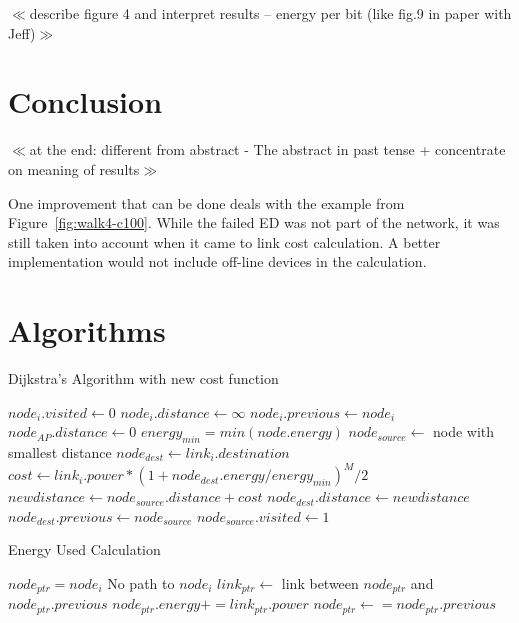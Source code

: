 \documentclass{article}
\begin{document}
$\ll$describe figure  4 and interpret results – energy per bit (like fig.9 in paper with Jeff)$\gg$ 

\section{Conclusion}
$\ll$at the end: different from abstract -  The abstract in past tense + concentrate on meaning of results$\gg$

One improvement that can be done deals with the example from Figure~\ref{fig:walk4-c100}. While the failed ED was not part of the network, it was still taken into account when it came to link cost calculation. A better implementation would not include off-line devices in the calculation.

{}


\appendix
\section{Algorithms}\label{appendix:algorithms}
\begin{algorithm}[!ht]
\caption{Dijkstra's Algorithm with new cost function}
\label{alg:dijkstra}
\begin{algorithmic}
	\STATE $node_i.visited \leftarrow 0$
	\STATE $node_i.distance \leftarrow \infty$
	\STATE $node_i.previous \leftarrow node_i$
\ENDFOR
\STATE $node_{AP}.distance \leftarrow 0$
\STATE $energy_{min} = min(node.energy)$
	\STATE $node_{source} \leftarrow $ node with smallest distance
			\STATE $node_{dest} \leftarrow link_i.destination$
				\STATE $cost \leftarrow link_i.power * (1 + node_{dest}.energy/energy_{min} )^M/2$
				\STATE $newdistance \leftarrow node_{source}.distance + cost$
				\STATE$node_{dest}.distance \leftarrow newdistance$
				\STATE$node_{dest}.previous \leftarrow node_{source}$
				\ENDIF
			\ENDIF
		\ENDIF
	\ENDFOR
	\STATE $node_{source}.visited \leftarrow 1$
\ENDWHILE
\end{algorithmic}
\end{algorithm}

\begin{algorithm}[!ht]
\caption{Energy Used Calculation}
\label{alg:energyused}
\begin{algorithmic}
	\STATE $node_{ptr} = node_i$
		\STATE No path to $node_i$
	\ELSE
			\STATE $link_{ptr} \leftarrow $ link between $node_{ptr}$ and $node_{ptr}.previous$
			\STATE $node_{ptr}.energy += link_{ptr}.power$
			\STATE $node_{ptr} \leftarrow = node_{ptr}.previous$
		\ENDWHILE
	\ENDIF
\ENDFOR
\end{algorithmic}
\end{algorithm}
\end{document}

